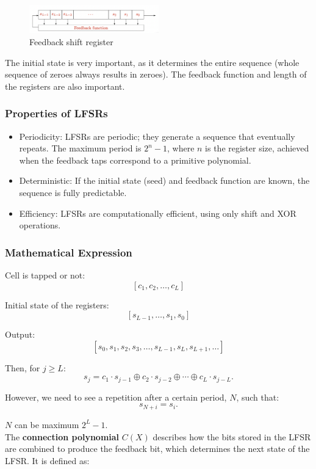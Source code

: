 \begin{figure}[h!]
    \centering
    \includegraphics[width=0.5\textwidth]{img/LFSR.png}
    \caption{Feedback shift register}
\end{figure}

The initial state is very important, as it determines the entire sequence (whole sequence of zeroes always results in zeroes). The feedback function and length of the registers are also important.

\subsubsection{Properties of LFSRs}
\begin{itemize}
    \item Periodicity: LFSRs are periodic; they generate a sequence that eventually repeats. The maximum period is $2^n - 1$, where $n$ is the register size, achieved when the feedback taps correspond to a primitive polynomial.
    \item Deterministic: If the initial state (seed) and feedback function are known, the sequence is fully predictable.
    \item Efficiency: LFSRs are computationally efficient, using only shift and XOR operations.
\end{itemize}

\subsubsection{Mathematical Expression}
Cell is tapped or not:
\[
[c_1, c_2, \dots, c_L]
\]

Initial state of the registers:
\[
[s_{L-1}, \dots, s_1, s_0]
\]

Output:
\[
[s_0, s_1, s_2, s_3, \dots, s_{L-1}, s_L, s_{L+1}, \dots]
\]

Then, for \(j \geq L\):
\[
s_j = c_1 \cdot s_{j-1} \oplus c_2 \cdot s_{j-2} \oplus \cdots \oplus c_L \cdot s_{j-L}.
\]

However, we need to see a repetition after a certain period, \(N\), such that:
\[
s_{N+i} = s_i.
\]

\(N\) can be maximum \(2^L - 1\). \\

The \textbf{connection polynomial} $C(X)$ describes how the bits stored in the LFSR are combined to produce the feedback bit, which determines the next state of the LFSR. It is defined as:

